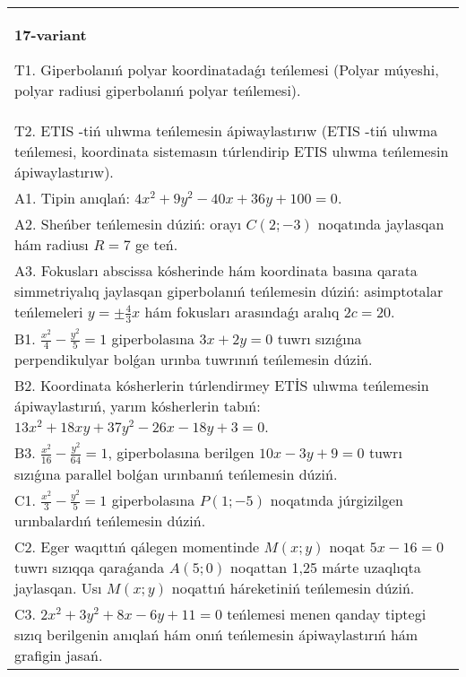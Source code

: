 \documentclass{article}
\begin{document}
\begin{tabular}{m{17cm}}
\textbf{17-variant}
\newline

T1. Giperbolanıń polyar koordinatadaǵı teńlemesi (Polyar múyeshi, polyar radiusi giperbolanıń polyar teńlemesi).\\

T2. ETIS -tiń ulıwma teńlemesin ápiwaylastırıw (ETIS -tiń ulıwma teńlemesi, koordinata sistemasın túrlendirip ETIS ulıwma teńlemesin ápiwaylastırıw).\\

A1. Tipin anıqlań: $4 x^2+9 y^2-40 x+36 y+100=0$.\\

A2. Sheńber teńlemesin dúziń: orayı $C (2;-3) $ noqatında jaylasqan hám radiusı $R=7$ ge teń.\\

A3. Fokusları abscissa kósherinde hám koordinata basına qarata simmetriyalıq jaylasqan giperbolanıń teńlemesin dúziń: asimptotalar teńlemeleri $y=\pm \frac{4}{3}x$ hám fokusları arasındaǵı aralıq $2 c=20$.\\

B1. $\frac{x^{2}}{4} - \frac{y^{2}}{5} = 1$ giperbolasına $3x + 2y = 0$ tuwrı sızıǵına perpendikulyar bolǵan urınba tuwrınıń teńlemesin dúziń.\\

B2. Koordinata kósherlerin túrlendirmey ETİS ulıwma teńlemesin ápiwaylastırıń, yarım kósherlerin tabıń: $13x^{2} + 18xy + 37y^{2} - 26x - 18y + 3 = 0$.  \\

B3. $\frac{x^{2}}{16} - \frac{y^{2}}{64} = 1$, giperbolasına berilgen $10x - 3y + 9 = 0$ tuwrı sızıǵına parallel bolǵan urınbanıń teńlemesin dúziń.  \\

C1. $\frac{x^{2}}{3} - \frac{y^{2}}{5} = 1$ giperbolasına $P(1; - 5)$ noqatında júrgizilgen urınbalardıń teńlemesin dúziń.\\

C2. Eger waqıttıń qálegen momentinde $M(x;y)$ noqat $5x - 16 = 0$ tuwrı sızıqqa qaraǵanda $A(5;0)$ noqattan 1,25 márte uzaqlıqta jaylasqan. Usı $M(x;y)$ noqattıń háreketiniń teńlemesin dúziń.  \\

C3. $2x^{2} + 3y^{2} + 8x - 6y + 11 = 0$ teńlemesi menen qanday tiptegi sızıq berilgenin anıqlań hám onıń teńlemesin ápiwaylastırıń hám grafigin jasań.  \\

\end{tabular}
\vspace{1cm}
\end{document}
